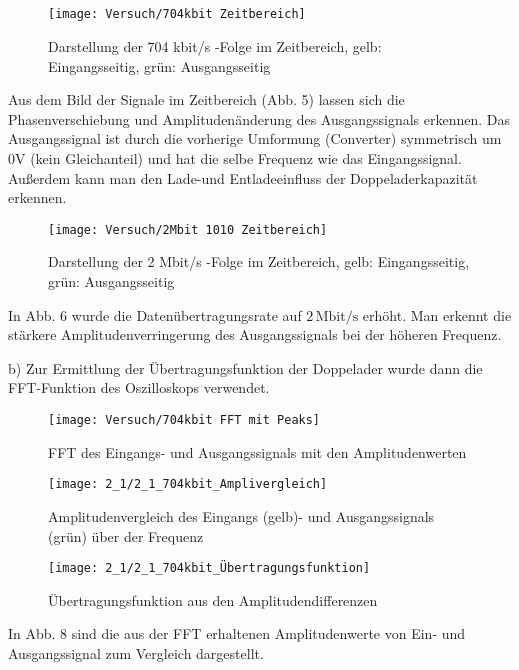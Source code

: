\documentclass[a4paper, 12pt]{article}
\begin{document}
\subsection{}

\begin{figure}[H]
	\texttt{[image: Versuch/704kbit Zeitbereich]}
  \caption{Darstellung der 704 kbit/s -Folge im Zeitbereich, gelb:
    Eingangsseitig, grün: Ausgangsseitig}
\end{figure}

Aus dem Bild der Signale im Zeitbereich (Abb. 5) lassen sich die
Phasenverschiebung und Amplitudenänderung des Ausgangssignals erkennen. Das
Ausgangssignal ist durch die vorherige Umformung (Converter) symmetrisch um 0V (kein Gleichanteil) und
hat die selbe Frequenz wie das Eingangssignal. Außerdem kann man den Lade-und
Entladeeinfluss der Doppeladerkapazität erkennen.

\begin{figure}[H]
	\texttt{[image: Versuch/2Mbit 1010 Zeitbereich]}
  \caption{Darstellung der 2 Mbit/s -Folge im Zeitbereich, gelb:
    Eingangsseitig, grün: Ausgangsseitig}
\end{figure}

In Abb. 6 wurde die Datenübertragungsrate auf $2 \, \textrm{Mbit/s}$ erhöht. Man
erkennt die stärkere Amplitudenverringerung des Ausgangssignals bei der höheren Frequenz. 

\pagebreak 
\noindent b) Zur Ermittlung der Übertragungsfunktion der Doppelader wurde dann die
FFT-Funktion des Oszilloskops verwendet.

\begin{figure}[H]
	\texttt{[image: Versuch/704kbit FFT mit Peaks]}
  \caption{FFT des Eingangs- und Ausgangssignals mit den Amplitudenwerten}
\end{figure}

\begin{figure}[H]
	\texttt{[image: 2\_1/2\_1\_704kbit\_Amplivergleich]}
  \caption{Amplitudenvergleich des Eingangs (gelb)- und Ausgangssignals (grün)
    über der Frequenz}
\end{figure}

\begin{figure}[H]
	\texttt{[image: 2\_1/2\_1\_704kbit\_Übertragungsfunktion]}
  \caption{Übertragungsfunktion aus den Amplitudendifferenzen}
\end{figure}

In Abb. 8 sind die aus der FFT erhaltenen Amplitudenwerte von Ein- und
Ausgangssignal zum Vergleich dargestellt.
\end{document}
